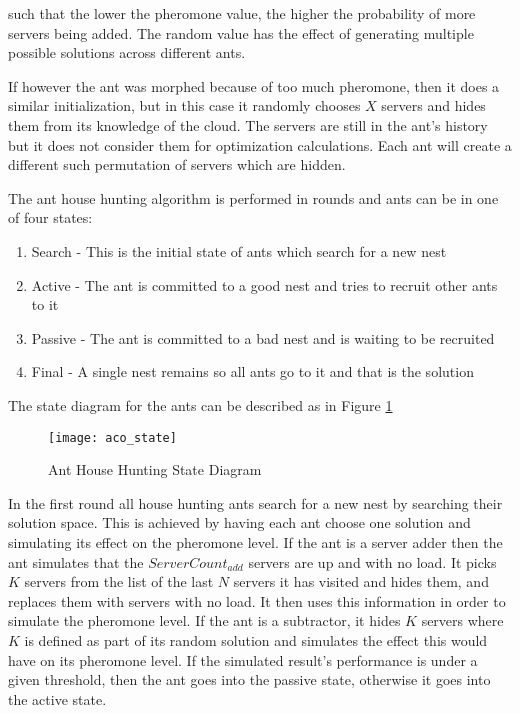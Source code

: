 such that the lower the pheromone value, the higher the probability of more servers being added. The random value has the effect of generating multiple possible solutions across different ants.

If however the ant was morphed because of too much pheromone, then it does a similar initialization, but in this case it randomly chooses $X$ servers and hides them from its knowledge of the cloud. The servers are still in the ant's history but it does not consider them for optimization calculations. Each ant will create a different such permutation of servers which are hidden.

The ant house hunting algorithm is performed in rounds and ants can be in one of four states:

\begin{enumerate}
	\item Search - This is the initial state of ants which search for a new nest
	\item Active - The ant is committed to a good nest and tries to recruit other ants to it
	\item Passive - The ant is committed to a bad nest and is waiting to be recruited
	\item Final - A single nest remains so all ants go to it and that is the solution
\end{enumerate}

The state diagram for the ants can be described as in Figure \ref{fig:anthousehuntingstate}

\begin{figure}
	\centering
	\texttt{[image: aco\_state]}
	\caption{Ant House Hunting State Diagram}
	\label{fig:anthousehuntingstate}
\end{figure}

In the first round all house hunting ants search for a new nest by searching their solution space. This is achieved by having each ant choose one solution and simulating its effect on the pheromone level. If the ant is a server adder then the ant simulates that the $ServerCount_{add}$ servers are up and with no load. It picks $K$ servers from the list of the last $N$ servers it has visited and hides them, and replaces them with servers with no load. It then uses this information in order to simulate the pheromone level. If the ant is a subtractor, it hides $K$ servers where $K$ is defined as part of its random solution and simulates the effect this would have on its pheromone level. If the simulated result's performance is under a given threshold, then the ant goes into the passive state, otherwise it goes into the active state.

